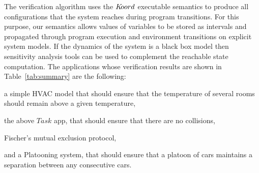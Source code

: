 The verification algorithm uses the $K\kern-2pt oord$ executable semantics to produce all configurations that the system reaches during program transitions. For this purpose, our semantics allows values of variables to be stored as intervals and propagated through program execution and environment transitions on explicit system models. If the dynamics of the system is a black box model then sensitivity analysis tools can be used to complement the reachable state computation.   The applications whose verification results are shown in Table~\ref{tab:summary} are the following:
\begin{inparaenum}[(i)]
\item a simple HVAC model that should ensure that the temperature of several rooms should remain above a  given temperature, 
\item  the above $\mathit{Task}$ app, that should ensure that there are no collisions, 
\item Fischer's mutual exclusion protocol, 
\item and a Platooning system, that should ensure that a platoon of cars maintains a separation between any consecutive cars. 
\end{inparaenum}



